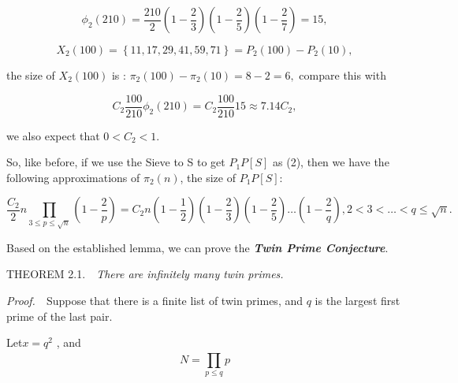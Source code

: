 \documentclass{article}
\begin{document}
\begin{equation}
 \phi_{2}\left(210\right) =\frac{210}{2}\left(1-\frac{2}{3}\right)\left(1-\frac{2}{5}\right)\left(1-\frac{2}{7}\right) = 15 ,  
\end{equation}


\begin{equation}
X_{2}\left(100\right) =\left\{ 11, 17, 29, 41, 59, 71\right\}  = P_{2}\left(100\right)- P_{2}\left(10\right),
\end{equation}


the { size of }\( X_{2}\left(100\right)\) is {:} \( \pi_{2}\left(100\right)-\pi_{2}\left(10\right) = 8-2 = 6,\) compare this with

\begin{equation}
C_{2}\frac{100}{210}  \phi_{2}\left(210\right) = C_{2}\frac{100}{210} 15\approx 7.14C_{2} ,  
\end{equation}


we also expect that \(  0<C_{2}<1\).

\vspace{1\baselineskip}

So, like before, if we use the Sieve to S to get \(  P_{1}P\left[S\right]\) as (2), then we have the following approximations of \( \pi_{2}\left(n\right)\), \( \)the size of \(  P_{1}P\left[S\right]\):

\begin{equation}
\frac{C_{2} }{2}n\prod_{3\leq p\leq\sqrt{n}}^{}\left(1-\frac{2}{p}\right) = C_{2} n\left(1-\frac{1}{2}\right)\left(1-\frac{2}{3}\right)\left(1-\frac{2}{5}\right)\ldots \left(1-\frac{2}{q}\right) ,    2<3<\ldots <q\leq\sqrt{n} .  
\end{equation}


Based on the established lemma, we can prove the \textbf{\textit{Twin Prime Conjecture}}.
\vspace{1\baselineskip}

THEOREM  2.1.\ \ \textit{There are infinitely many twin primes.}

\textit{Proof.}\ \ Suppose that there is a finite list of twin primes, and \( q\) is the largest first prime of the last pair.

\begin{center}
Let\(    x = q^{2}\) ,  and \textit{ { \\ }}\begin{equation}
N = \prod_{p\leq q}^{}p
\end{equation}

\end{center}
\end{document}
